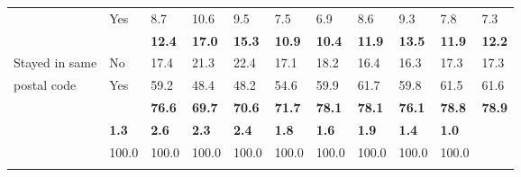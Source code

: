 \begin{table}[h]
{\begin{tabular}{ll p{1.2cm}p{1.2cm}p{0.9cm}p{1.1cm}p{1.1cm}p{1.0cm}p{0.9cm}p{1.0cm}p{1.0cm}}
			& Yes        & 8.7           & 10.6          & 9.5           & 7.5           & 6.9           & 8.6           & 9.3           & 7.8           & 7.3           \\
			\multicolumn{2}{l}{}                 & \textbf{12.4} & \textbf{17.0} & \textbf{15.3} & \textbf{10.9} & \textbf{10.4} & \textbf{11.9} & \textbf{13.5} & \textbf{11.9} & \textbf{12.2} \\ \arrayrulecolor{lightgray}\hline
			Stayed in same            & No         & 17.4          & 21.3          & 22.4          & 17.1          & 18.2          & 16.4          & 16.3          & 17.3          & 17.3          \\
			postal code & Yes        & 59.2          & 48.4          & 48.2          & 54.6          & 59.9          & 61.7          & 59.8          & 61.5          & 61.6          \\
			\multicolumn{2}{l}{}                 & \textbf{76.6} & \textbf{69.7} & \textbf{70.6} & \textbf{71.7} & \textbf{78.1} & \textbf{78.1} & \textbf{76.1} & \textbf{78.8} & \textbf{78.9} \\ \arrayrulecolor{lightgray}\hline
			\multicolumn{2}{l}{Births}           & \textbf{1.3}  & \textbf{2.6}  & \textbf{2.3}  & \textbf{2.4}  & \textbf{1.8}  & \textbf{1.6}  & \textbf{1.9}  & \textbf{1.4}  & \textbf{1.0}  \\ \arrayrulecolor{black}\hline
			\multicolumn{2}{l}{Total}            & 100.0         & 100.0         & 100.0         & 100.0         & 100.0         & 100.0         & 100.0         &  100.0         & 100.0 \\ \arrayrulecolor{black}\hline       
		\end{tabular}
	}
	
\end{table}



\vspace{5mm}

